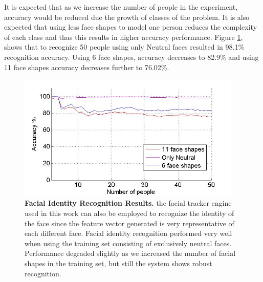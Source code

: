 \documentclass[]{article}
\begin{document}
It is expected that as we increase the number of people in the experiment, accuracy would be reduced due the growth of
classes of the problem. It is also expected  that using less face shapes to model one person reduces the complexity of
each class and thus this results in higher accuracy performance. Figure \ref{feRecognition}, shows that to recognize 50
people using only Neutral faces resulted in 98.1\% recognition accuracy.  Using 6 face shapes, accuracy decreases to
82.9\% and using 11 face shapes accuracy decreases further to 76.02\%.


\begin{figure}[ht]
\begin{center}
\vspace{-3mm}
\includegraphics[width=0.95\textwidth]{figures/peopleRecognition4.jpg}
\end{center}
\caption{\textbf{Facial Identity Recognition Results.} the facial tracker engine used in this work can also be employed 
to recognize the identity of the face since the feature vector generated is very representative  of each different face.
Facial identity recognition performed very well when using the training set consisting of exclusively neutral faces. 
Performance degraded slightly as we increased the number of facial shapes in the training set, but still the system shows 
robust  recognition.}
\label{feRecognition}
\end{figure}
\end{document}

